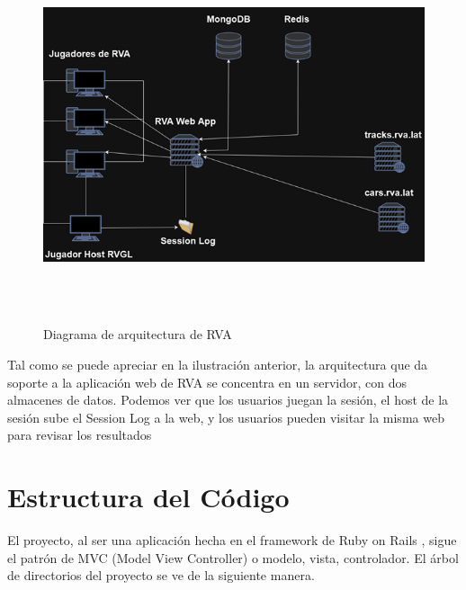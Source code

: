 \begin{figure}[H]
  \begin{center}
    \includegraphics[width=16cm, height=11cm]{img/architecture.png} 
  \end{center}
  \caption[Diagrama de arquitectura de RVA]{Diagrama de arquitectura de RVA}
  \label{fig:architecture.png}
\end{figure}

Tal como se puede apreciar en la ilustración anterior, la arquitectura que da soporte a la aplicación web de RVA se concentra en un servidor, con dos almacenes de datos. Podemos ver que los usuarios juegan la sesión, el host de la sesión sube el Session Log a la web, y los usuarios pueden visitar la misma web para revisar los resultados

\newpage

\section{Estructura del Código}
El proyecto, al ser una aplicación hecha en el framework de Ruby on Rails \cite{rubyonrails}, sigue el patrón de MVC (Model View Controller) o modelo, vista, controlador. El árbol de directorios del proyecto se ve de la siguiente manera.

